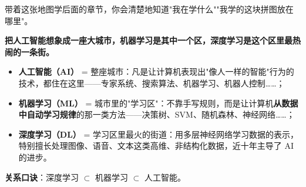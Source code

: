 \documentclass[a4paper,11pt]{ctexart}
\begin{document}
带着这张地图学后面的章节，你会清楚地知道"我在学什么""我学的这块拼图放在哪里"。

\begin{metaphorbox}
    \textbf{把人工智能想象成一座大城市，机器学习是其中一个区，深度学习是这个区里最热闹的一条街。}

    \begin{itemize}
        \item \textbf{人工智能（AI）} = 整座城市：凡是让计算机表现出"像人一样的智能"行为的技术，都住在这里——专家系统、搜索算法、机器学习、机器人控制……；
        \item \textbf{机器学习（ML）} = 城市里的"学习区"：不靠手写规则，而是让计算机\textbf{从数据中自动学习规律}的那一类方法——决策树、SVM、随机森林、神经网络……；
        \item \textbf{深度学习（DL）} = 学习区里最火的街道：用多层神经网络学习数据的表示，特别擅长处理图像、语音、文本这类高维、非结构化数据，近十年主导了 AI 的进步。
    \end{itemize}

    \textbf{关系口诀}：深度学习 $\subset$ 机器学习 $\subset$ 人工智能。
\end{metaphorbox}
\end{document}
